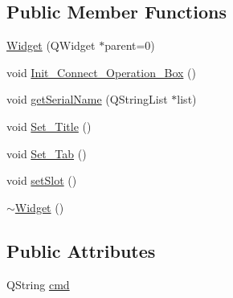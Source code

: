 \subsection*{Public Member Functions}
\begin{DoxyCompactItemize}
\item 
\mbox{\hyperlink{class_widget_a29531c7f141e461322981b3b579d4590}{Widget}} (Q\+Widget $\ast$parent=0)
\item 
void \mbox{\hyperlink{class_widget_a73ede9961382ea942361e9845fa11aa0}{Init\+\_\+\+Connect\+\_\+\+Operation\+\_\+\+Box}} ()
\item 
void \mbox{\hyperlink{class_widget_afb97de9294ffdbb2c64ed1f96aea9261}{get\+Serial\+Name}} (Q\+String\+List $\ast$list)
\item 
void \mbox{\hyperlink{class_widget_a5323ca5c4124c0d187a2f1398ef48844}{Set\+\_\+\+Title}} ()
\item 
void \mbox{\hyperlink{class_widget_ac611086a6f74fe7bab712f23ab7126d8}{Set\+\_\+\+Tab}} ()
\item 
void \mbox{\hyperlink{class_widget_ac60c5a62bc3197fbc7ade8f40df70c70}{set\+Slot}} ()
\item 
\mbox{\hyperlink{class_widget_aa24f66bcbaaec6d458b0980e8c8eae65}{$\sim$\+Widget}} ()
\end{DoxyCompactItemize}
\subsection*{Public Attributes}
\begin{DoxyCompactItemize}
\item 
Q\+String \mbox{\hyperlink{class_widget_a08095644a5511e36fc9e52228e79dc81}{cmd}}
\end{DoxyCompactItemize}
